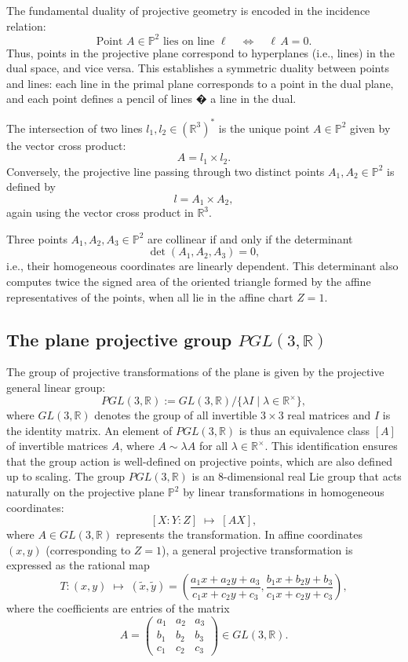 \documentclass[12pt,reqno]{amsart}
\begin{document}
 The fundamental duality of projective geometry is encoded in the incidence relation:
\[
\text{Point } A \in \mathbb{P}^2 \text{ lies on line } \ell \quad \Longleftrightarrow \quad  \ell \, A  = 0.
\]
Thus, points in the projective plane correspond to hyperplanes (i.e., lines) in the dual space, and vice versa. This establishes a symmetric duality between points and lines: each line in the primal plane corresponds to a point in the dual plane, and each point defines a pencil of lines � a line in the dual.

 The intersection of two lines $l_1, l_2 \in (\mathbb{R}^3)^*$ is the unique point $A \in \mathbb{P}^2$ given by the vector cross product:
\[
A = l_1 \times l_2.
\]
Conversely, the projective line passing through two distinct points $A_1, A_2 \in \mathbb{P}^2$ is defined by
\[
l = A_1 \times A_2,
\]
again using the vector cross product in $\mathbb{R}^3$.

 Three points $A_1, A_2, A_3 \in \mathbb{P}^2$ are collinear if and only if the determinant
\[
\det(A_1, A_2, A_3) = 0,
\]
i.e., their homogeneous coordinates are linearly dependent. This determinant also computes twice the signed area of the oriented triangle formed by the affine representatives of the points, when all lie in the affine chart $Z=1$.



\subsection{The plane projective group $PGL(3,\mathbb{R})$}

The group of projective transformations of the plane is given by the projective general linear group:
\[
PGL(3,\mathbb{R}) := GL(3,\mathbb{R}) / \{\lambda I \mid \lambda \in \mathbb{R}^\times\},
\]
where $GL(3,\mathbb{R})$ denotes the group of all invertible $3 \times 3$ real matrices  and $I$ is the identity matrix.
An element of $PGL(3,\mathbb{R})$ is thus an equivalence class $[A]$ of invertible matrices $A$, where $A \sim \lambda A$ for all $\lambda \in \mathbb{R}^\times$. This identification ensures that the group action is well-defined on projective points, which are also defined up to scaling.
The group $PGL(3,\mathbb{R})$ is an 8-dimensional real Lie group that  
acts naturally on the projective plane $\mathbb{P}^2$ by linear transformations in homogeneous coordinates:
\[
[X:Y:Z] \;\longmapsto\; [AX],
\]
where $A \in GL(3,\mathbb{R})$ represents the transformation. In affine coordinates $(x,y)$ (corresponding to $Z = 1$), a general projective transformation is expressed as the rational map
\begin{equation*}%
T\colon(x,y)\;\longmapsto\; (\tilde x, \tilde y)=
\left(
    \frac{a_1 x + a_2 y + a_3}{c_1 x + c_2 y + c_3},
    \frac{b_1 x + b_2 y + b_3}{c_1 x + c_2 y + c_3}
\right),
\end{equation*}
where the coefficients are entries of the matrix
\[
A = 
\begin{pmatrix}
a_1 & a_2 & a_3 \\
b_1 & b_2 & b_3 \\
c_1 & c_2 & c_3
\end{pmatrix} \in GL(3,\mathbb{R}).
\]
\end{document}
